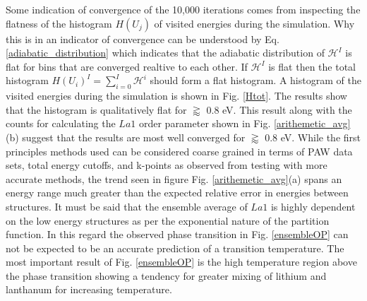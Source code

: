 \documentclass[aps,pre,reprint,superscriptaddress,showkeys]{revtex4-2}
\begin{document}
Some indication of convergence of the 10,000 iterations comes from inspecting the flatness of the histogram $H(U_j)$ of visited energies during the simulation. Why this is in an indicator of convergence can be understood by Eq. \ref{adiabatic_distribution} which indicates that the adiabatic distribution of $\mathcal{H}^I$ is flat for bins that are converged realtive to each other. If $\mathcal{H}^I$ is flat then the total histogram $H(U_i)^I=\sum_{i=0}^I\mathcal{H}^i$ should form a flat histogram.   A histogram of the visited energies during the simulation is shown in Fig. \ref{Htot}. The results show that  the histogram is qualitatively flat for $\gtrapprox $ 0.8 eV. This result along with the counts for calculating the $La1$ order parameter shown in Fig. \ref{arithemetic_avg}(b) suggest that the results are most well converged for $\gtrapprox $ 0.8 eV.  While the first principles methods used can be considered coarse grained in terms of PAW data sets, total energy cutoffs, and k-points as observed from testing with more accurate methods, the trend seen in figure Fig. \ref{arithemetic_avg}(a) spans an energy range much greater than the expected relative error in energies between structures. It must be said that the ensemble average of $La1$ is highly dependent on the low energy structures as per the exponential nature of the partition function. In this regard the observed phase transition in Fig. \ref{ensembleOP} can not be expected to be an accurate prediction of a transition temperature. The most important result of Fig. \ref{ensembleOP} is the high temperature region above the phase transition showing a tendency for greater mixing of lithium and lanthanum for increasing temperature. 
\end{document}
